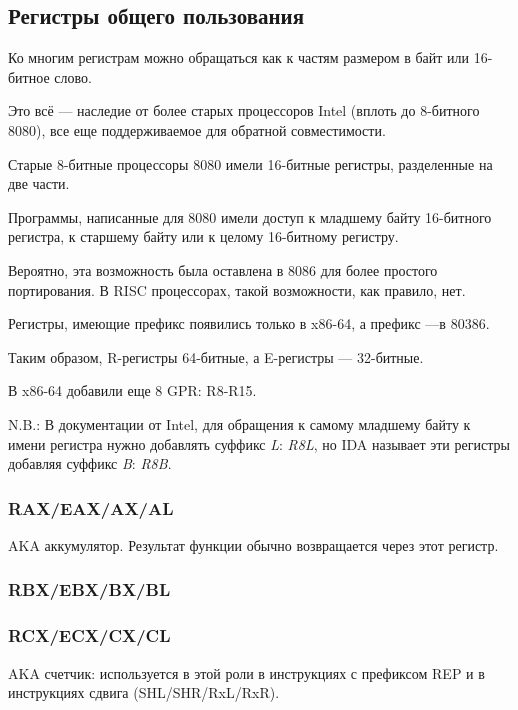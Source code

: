 \subsection{Регистры общего пользования}

Ко многим регистрам можно обращаться как к частям размером в байт или 16-битное слово.

Это всё --- наследие от более старых процессоров Intel (вплоть до 8-битного 8080),
все еще поддерживаемое для обратной совместимости.

Старые 8-битные процессоры 8080 имели 16-битные регистры, разделенные на две части.

Программы, написанные для 8080 имели доступ к младшему байту 16-битного регистра, к старшему
байту или к целому 16-битному регистру.

Вероятно, эта возможность была оставлена в 8086 для более простого портирования.
В \ac{RISC} процессорах, такой возможности, как правило, нет.

Регистры, имеющие префикс  появились только в x86-64, а префикс  ---в 80386.

Таким образом, R-регистры 64-битные, а E-регистры --- 32-битные.

В x86-64 добавили еще 8 \ac{GPR}: R8-R15.

N.B.: В документации от Intel, для обращения к самому младшему байту к имени регистра
нужно добавлять суффикс \emph{L}: \emph{R8L}, но \ac{IDA} называет эти регистры добавляя суффикс \emph{B}: \emph{R8B}.

\subsubsection{RAX/EAX/AX/AL}

\ac{AKA} аккумулятор.
Результат функции обычно возвращается через этот регистр.

\subsubsection{RBX/EBX/BX/BL}

\subsubsection{RCX/ECX/CX/CL}

\ac{AKA} счетчик:
используется в этой роли в инструкциях с префиксом REP и в инструкциях сдвига
(SHL/SHR/RxL/RxR).


